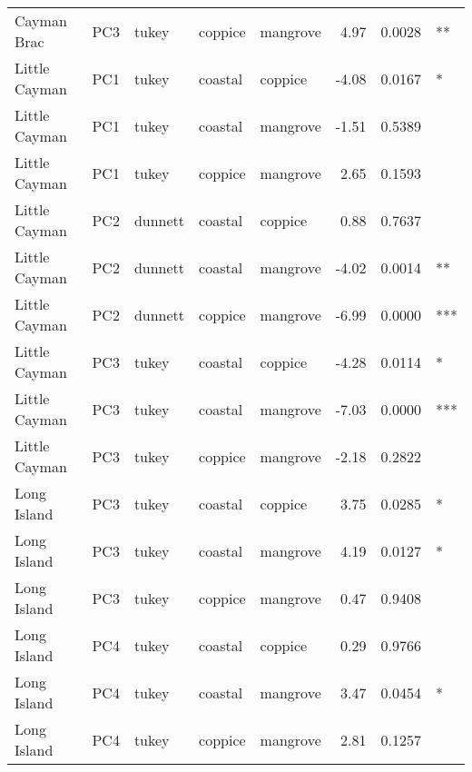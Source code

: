 \begin{tabular}{lllllrrl}
Cayman Brac & PC3 & tukey & coppice & mangrove & 4.97 & 0.0028 & **\\
Little Cayman & PC1 & tukey & coastal & coppice & -4.08 & 0.0167 & *\\
\addlinespace
Little Cayman & PC1 & tukey & coastal & mangrove & -1.51 & 0.5389 & \\
Little Cayman & PC1 & tukey & coppice & mangrove & 2.65 & 0.1593 & \\
Little Cayman & PC2 & dunnett & coastal & coppice & 0.88 & 0.7637 & \\
Little Cayman & PC2 & dunnett & coastal & mangrove & -4.02 & 0.0014 & **\\
Little Cayman & PC2 & dunnett & coppice & mangrove & -6.99 & 0.0000 & ***\\
\addlinespace
Little Cayman & PC3 & tukey & coastal & coppice & -4.28 & 0.0114 & *\\
Little Cayman & PC3 & tukey & coastal & mangrove & -7.03 & 0.0000 & ***\\
Little Cayman & PC3 & tukey & coppice & mangrove & -2.18 & 0.2822 & \\
Long Island & PC3 & tukey & coastal & coppice & 3.75 & 0.0285 & *\\
Long Island & PC3 & tukey & coastal & mangrove & 4.19 & 0.0127 & *\\
\addlinespace
Long Island & PC3 & tukey & coppice & mangrove & 0.47 & 0.9408 & \\
Long Island & PC4 & tukey & coastal & coppice & 0.29 & 0.9766 & \\
Long Island & PC4 & tukey & coastal & mangrove & 3.47 & 0.0454 & *\\
Long Island & PC4 & tukey & coppice & mangrove & 2.81 & 0.1257 & \\
\bottomrule
\end{tabular}
